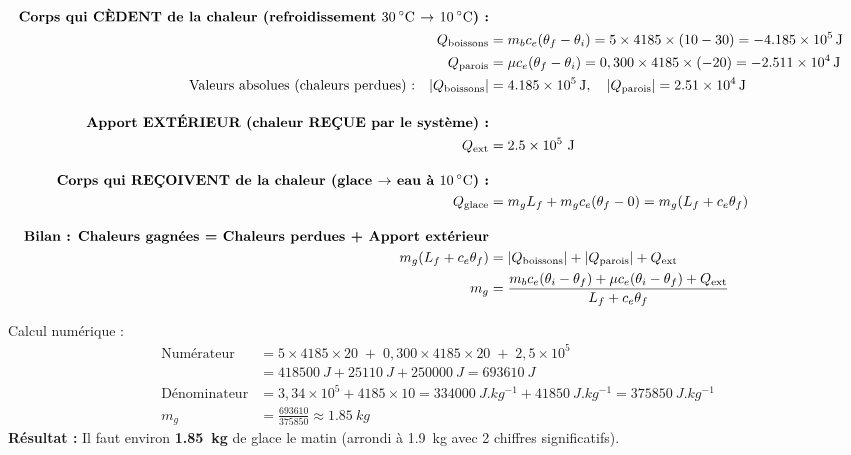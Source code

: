 \documentclass[11pt]{article}
\begin{document}
\begin{exoresolu}
\begin{align*}
\textbf{Corps qui CÈDENT de la chaleur (refroidissement \SI{30}{\celsius} $\rightarrow$ \SI{10}{\celsius}) :} \\
Q_{\text{boissons}} &= m_b c_e (\theta_f - \theta_i) = 5 \times 4185 \times (10 - 30) = \SI{-4,185e5}{J} \\
Q_{\text{parois}} &= \mu c_e (\theta_f - \theta_i) = 0,300 \times 4185 \times (-20) = \SI{-2,511e4}{J} \\
\text{Valeurs absolues (chaleurs perdues) :} \quad |Q_{\text{boissons}}| &= \SI{4,185e5}{J}, \quad |Q_{\text{parois}}| = \SI{2,51e4}{J} \\[1em]
\textbf{Apport EXTÉRIEUR (chaleur REÇUE par le système) :} \\
Q_{\text{ext}} &= \num{2,5e5}\ \si{J} \\[1em]
\textbf{Corps qui REÇOIVENT de la chaleur (glace $\rightarrow$ eau à \SI{10}{\celsius}) :} \\
Q_{\text{glace}} &= m_g L_f + m_g c_e (\theta_f - 0) = m_g (L_f + c_e \theta_f) \\[1em]
\textbf{Bilan : Chaleurs gagnées = Chaleurs perdues + Apport extérieur} \\
m_g (L_f + c_e \theta_f) &= |Q_{\text{boissons}}| + |Q_{\text{parois}}| + Q_{\text{ext}} \\
m_g &= \frac{m_b c_e (\theta_i - \theta_f) + \mu c_e (\theta_i - \theta_f) + Q_{\text{ext}}}{L_f + c_e \theta_f}
\end{align*}

Calcul numérique :
\begin{align*}
\text{Numérateur} &= 5 \times 4185 \times 20 \;+\; 0,300 \times 4185 \times 20 \;+\; 2,5\times10^5 \\
&= \SI{418500}{J} + \SI{25110}{J} + \SI{250000}{J} = \SI{693610}{J} \\
\text{Dénominateur} &= 3,34\times10^5 + 4185 \times 10 = \SI{334000}{J.kg^{-1}} + \SI{41850}{J.kg^{-1}} = \SI{375850}{J.kg^{-1}} \\
m_g &= \frac{693610}{375850} \approx \SI{1,85}{kg}
\end{align*}
\textbf{Résultat :} Il faut environ \textbf{\SI{1,85}{kg}} de glace le matin (arrondi à \SI{1,9}{kg} avec 2 chiffres significatifs).


\end{exoresolu}
\end{document}
